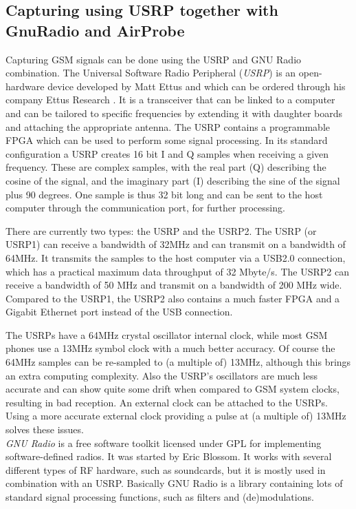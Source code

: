 \documentclass[a4paper,11pt]{llncs}
\begin{document}
\subsection{Capturing using USRP together with GnuRadio and AirProbe}\label{sec:prac_capt}
Capturing GSM signals can be done using the USRP and GNU Radio combination.
The Universal Software Radio Peripheral (\textit{USRP}) is an open-hardware device developed by Matt Ettus and which can be ordered through his company Ettus Research \cite{url:ettus}. It is a transceiver that can be linked to a computer and can be tailored to specific frequencies by extending it with daughter boards and attaching the appropriate antenna. The USRP contains a programmable FPGA which can be used to perform some signal processing. In its standard configuration a USRP creates 16 bit I and Q samples when receiving a given frequency. These are complex samples, with the real part (Q) describing the cosine of the signal, and the imaginary part (I) describing the sine of the signal plus 90 degrees. One sample is thus 32 bit long and can be sent to the host computer through the communication port, for further processing.

There are currently two types: the USRP and the USRP2. The USRP (or USRP1) can receive a bandwidth of 32MHz and can transmit on a bandwidth of 64MHz. It transmits the samples to the host computer via a USB2.0 connection, which has a practical maximum data throughput of 32 Mbyte/s. The USRP2 can receive a bandwidth of 50 MHz and transmit on a bandwidth of 200 MHz wide. Compared to the USRP1, the USRP2 also contains a much faster FPGA and a Gigabit Ethernet port instead of the USB connection. 

The USRPs have a 64MHz crystal oscillator internal clock, while most GSM phones use a 13MHz symbol clock with a much better accuracy. Of course the 64MHz samples can be re-sampled to (a multiple of) 13MHz, although this brings an extra computing complexity.  Also the USRP's oscillators are much less accurate and can show quite some drift when compared to GSM system clocks, resulting in bad reception. An external clock can be attached to the USRPs. Using a more accurate external clock providing a pulse at (a multiple of) 13MHz solves these issues.\\

\textit{GNU Radio} \cite{url:gnuradio} is a free software toolkit licensed under GPL for implementing software-defined radios. It was started by Eric Blossom. It works with several different types of RF hardware, such as soundcards, but it is mostly used in combination with an USRP. Basically GNU Radio is a library containing lots of standard signal processing functions, such as filters and (de)modulations.\\
\end{document}
